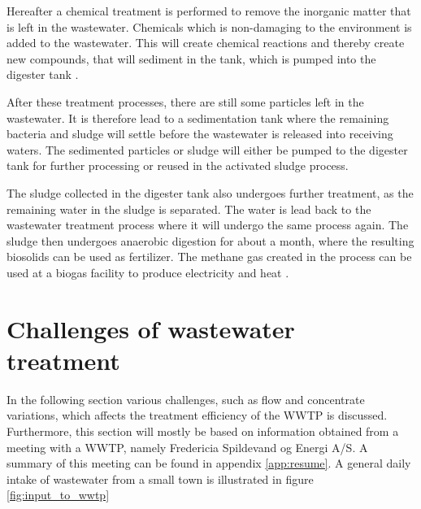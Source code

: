 Hereafter a chemical treatment is performed to remove the inorganic matter that is left in the wastewater. Chemicals which is non-damaging to the environment is added to the wastewater.
This will create chemical reactions and thereby create new compounds, that will sediment in the tank, which is pumped into the digester tank \cite{youtube_wastewater}.  

After these treatment processes, there are still some particles left in the wastewater. It is therefore lead to a sedimentation tank where the remaining bacteria and sludge will settle before the wastewater is released into receiving waters. The sedimented particles or sludge will either be pumped to the digester tank for further processing or reused in the activated sludge process.


The sludge collected in the digester tank also undergoes further treatment, as the remaining water in the sludge is separated. The water is lead back to the wastewater treatment process where it will undergo the same process again. The sludge then undergoes anaerobic digestion for about a month, where the resulting biosolids can be used as fertilizer. The methane gas created in the process can be used at a biogas facility to produce electricity and heat \cite{wwtp_ekstra}.


\section{Challenges of wastewater treatment}\label{sec:WWTP_challenges}
In the following section various challenges, such as flow and concentrate variations, which affects the treatment efficiency of the WWTP is discussed. 
Furthermore, this section will mostly be based on information obtained from a meeting with a WWTP, namely Fredericia Spildevand og Energi A/S. A summary of this meeting can be found in appendix \ref{app:resume}.
A general daily intake of wastewater from a small town is illustrated in figure \ref{fig:input_to_wwtp}  

